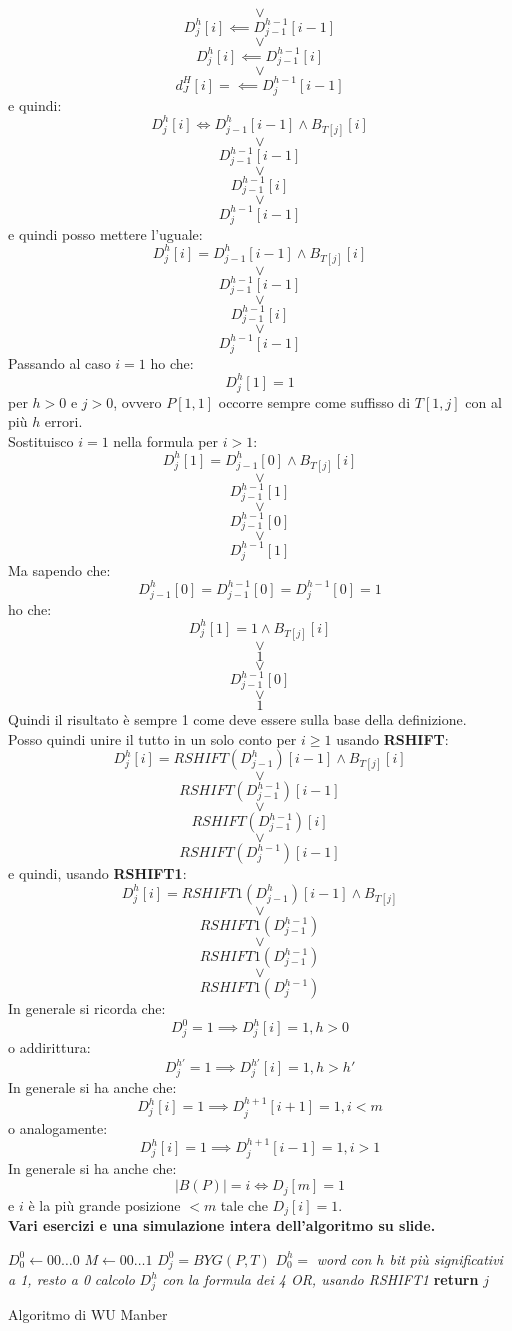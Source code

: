 \documentclass[a4paper,12pt, oneside]{book}
\begin{document}
\[\lor\]
\[D_j^h[i]\impliedby D_{j-1}^{h-1}[i-1] \]
\[\lor\]
\[D^h_j[i]  \impliedby D_{j-1}^{h-1}[i]\]
\[\lor\]
\[d_J^H[i]=\impliedby D_j^{h-1}[i-1]\]
e quindi:
\[D_j^h[i]\iff D_{j-1}^h[i-1]\land B_{T[j]}[i]\]
\[\lor\]
\[D_{j-1}^{h-1}[i-1] \]
\[\lor\]
\[ D_{j-1}^{h-1}[i]\]
\[\lor\]
\[ D_j^{h-1}[i-1]\]
e quindi posso mettere l'uguale:
\[D_j^h[i]= D_{j-1}^h[i-1]\land B_{T[j]}[i]\]
\[\lor\]
\[D_{j-1}^{h-1}[i-1] \]
\[\lor\]
\[ D_{j-1}^{h-1}[i]\]
\[\lor\]
\[ D_j^{h-1}[i-1]\]
Passando al caso $i=1$ ho che:
\[D_j^h[1]=1\]
per $h>0$ e $j>0$, ovvero $P[1,1]$ occorre sempre come suffisso di $T[1,j]$ con
al più $h$ errori.\\
Sostituisco $i=1$ nella formula per $i>1$:
\[D_j^h[1]= D_{j-1}^h[0]\land B_{T[j]}[i]\]
\[\lor\]
\[D_{j-1}^{h-1}[1] \]
\[\lor\]
\[ D_{j-1}^{h-1}[0]\]
\[\lor\]
\[ D_j^{h-1}[1]\]
Ma sapendo che:
\[D_{j-1}^h[0]=D_{j-1}^{h-1}[0]=D_j^{h-1}[0]=1\]
ho che:
\[D_j^h[1]=1\land B_{T[j]}[i]\]
\[\lor\]
\[1 \]
\[\lor\]
\[ D_{j-1}^{h-1}[0]\]
\[\lor\]
\[ 1\]
Quindi il risultato è sempre 1 come deve essere sulla base della definizione.\\
Posso quindi unire il tutto in un solo conto per $i\geq 1$ usando
\textbf{RSHIFT}:
\[D_j^h[i]=  RSHIFT(D_{j-1}^h)[i-1]\land B_{T[j]}[i]\]
\[\lor\]
\[ RSHIFT(D_{j-1}^{h-1})[i-1] \]
\[\lor\]
\[  RSHIFT(D_{j-1}^{h-1})[i]\]
\[\lor\]
\[ RSHIFT(D_j^{h-1})[i-1]\]
e quindi, usando \textbf{RSHIFT1}:
\[D_j^h[i]=  RSHIFT1(D_{j-1}^h)[i-1]\land B_{T[j]}\]
\[\lor\]
\[ RSHIFT1(D_{j-1}^{h-1})\]
\[\lor\]
\[  RSHIFT1(D_{j-1}^{h-1})\]
\[\lor\]
\[ RSHIFT1(D_j^{h-1})\]
In generale si ricorda che:
\[D^0_j=1\implies D_j^h[i]=1,h>0\]
o addirittura:
\[D^{h'}_j=1\implies D_j^{h'}[i]=1,h>h'\]
In generale si ha anche che:
\[D_j^h[i]=1\implies D_j^{h+1}[i+1]=1, i< m\]
o analogamente:
\[D_j^h[i]=1\implies D_j^{h+1}[i-1]=1, i>1\]
In generale si ha anche che:
\[|B(P)|=i\iff D_j[m]=1\]
e $i$ è la più grande posizione $<m$ tale che $D_j[i]=1$.\\
\textbf{Vari esercizi e una simulazione intera dell'algoritmo su slide.}
\begin{algorithm}
  \begin{algorithmic}
    \State $D_0^0\gets 00\ldots 0$
    \State $M\gets 00\ldots 1$
    \State $D_j^0=BYG(P,T)$
    \State $D_0^h=$\textit{ word con $h$ bit più significativi a 1, resto a 0}
    \State \textit{calcolo} $D_j^h$ \textit{con la formula dei 4 OR, usando
    RSHIFT1} 
    \State \textbf{return} $j$
    \EndIf
    \EndFor
    \EndFor
    \EndFunction
  \end{algorithmic}
  \caption{Algoritmo di WU Manber}
\end{algorithm}
\end{document}
